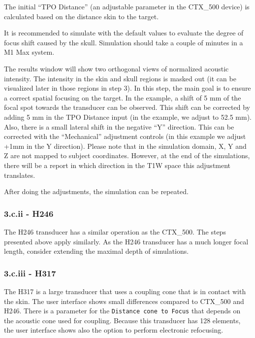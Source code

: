 The initial ``TPO Distance'' (an adjustable parameter in the CTX\_500
device) is calculated based on the distance skin to the target.

It is recommended to simulate with the default values to evaluate the
degree of focus shift caused by the skull. Simulation should take a
couple of minutes in a M1 Max system.

The results window will show two orthogonal views of normalized acoustic
intensity. The intensity in the skin and skull regions is masked out (it
can be visualized later in those regions in step 3). In this step, the
main goal is to ensure a correct spatial focusing on the target. In the
example, a shift of 5 mm of the focal spot towards the transducer can be
observed. This shift can be corrected by adding 5 mm in the TPO Distance
input (in the example, we adjust to 52.5 mm). Also, there is a small
lateral shift in the negative ``Y'' direction. This can be corrected
with the ``Mechanical'' adjustment controls (in this example we adjust
+1mm in the Y direction). Please note that in the simulation domain, X,
Y and Z are not mapped to subject coordinates. However, at the end of
the simulations, there will be a report in which direction in the T1W
space this adjustment translates.

After doing the adjustments, the simulation can be repeated.

\hypertarget{c.ii---h246}{%
\subsubsection{3.c.ii - H246}\label{c.ii---h246}}

The H246 transducer has a similar operation as the CTX\_500. The steps
presented above apply similarly. As the H246 transducer has a much
longer focal length, consider extending the maximal depth of
simulations.

\hypertarget{c.iii---h317}{%
\subsubsection{3.c.iii - H317}\label{c.iii---h317}}

The H317 is a large transducer that uses a coupling cone that is in
contact with the skin. The user interface shows small differences
compared to CTX\_500 and H246. There is a parameter for the
\texttt{Distance\ cone\ to\ Focus} that depends on the acoustic cone
used for coupling. Because this transducer has 128 elements, the user
interface shows also the option to perform electronic refocusing.

